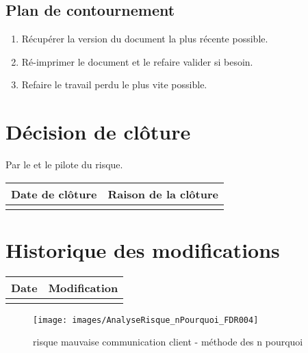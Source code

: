 \flushleft
\subsection*{Plan de contournement}

\begin{enumerate}
	\item Récupérer la version du document la plus récente possible.
	\item Ré-imprimer le document et le refaire valider si besoin.
	\item Refaire le travail perdu le plus vite possible.
\end{enumerate}

\section*{Décision de clôture}
Par le \CP{} et le pilote du risque.
\begin{table}[H]
\centering
	\begin{tabularx}{16.8cm}{|X|X|}
	\hline
	\rowcolor{gray!40} Date de clôture & Raison de la clôture \\
	\hline
	  & \\
	\hline
	\end{tabularx}
\end{table}

\section*{Historique des modifications}
\begin{table}[H]
\centering
	\begin{tabularx}{16.8cm}{|X|X|}
	\hline	
        \rowcolor{gray!40} Date & Modification \\
	\hline
	  & \\
	\hline
	\end{tabularx}
\end{table}
\newpage

\begin{figure}
	\centering
	\texttt{[image: images/AnalyseRisque\_nPourquoi\_FDR004]}
	\caption{\label{risque mauvaise communication client}risque mauvaise communication client - méthode des n pourquoi}
\end{figure}
